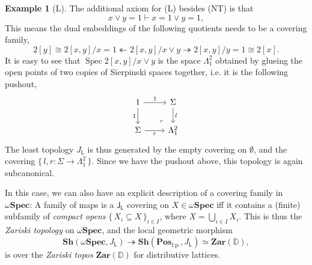 \documentclass[12pt]{amsart}
\theoremstyle{definition}
\newtheorem{example}[theorem]{Example}
\newcommand{\mb}[1]{\mathbf{#1}}
\newcommand{\mbb}[1]{\mathbb{#1}}
\newcommand{\mr}[1]{\mathrm{#1}}
\newcommand{\ms}[1]{\mathsf{#1}}
\newcommand{\Pos}{\mb{Pos}}
\newcommand{\sh}{\mb{Sh}}
\newcommand{\set}[1]{\{\,#1\,\}}
\newcommand{\surj}{\twoheadrightarrow}
\newcommand{\fp}{_{\mr{f.p.}}}
\newcommand{\emp}{\emptyset}
\newcommand{\wSpec}{\omega\mb{Spec}}
\newcommand{\spec}{\operatorname{Spec}}
\begin{document}
\begin{example}[L]
  The additional axiom for (L) besides (NT) is that 
  \[ x \vee y = 1 \vdash x = 1 \vee y = 1, \] 
  This means the dual embeddings of the following quotients needs to be a covering family,
  \[ 2[y] \cong 2[x,y]/x = 1 \twoheadleftarrow 2[x,y]/x\vee y \surj 2[x,y]/y=1 \cong 2[x]. \]
  It is easy to see that $\spec 2[x,y]/x \vee y$ is the space $\Lambda^2_1$ obtained by glueing the open points of two copies of Sierpinski spaces together, i.e. it is the following pushout,
  \[
  \begin{tikzcd}
    1 \ar[d, "1"'] \ar[r, "1"] & \Sigma \ar[d, "l"] \\ 
    \Sigma \ar[r, "r"'] & \Lambda^2_1
    \arrow["\lrcorner"{anchor=center, pos=0.125, rotate=180}, draw=none, from=2-2, to=1-1]    
  \end{tikzcd}
  \]
  The least topology $J_{\ms L}$ is thus generated by the empty covering on $\emp$, and the covering $\set{l,r : \Sigma \to \Lambda^2_1}$. Since we have the pushout above, this topology is again subcanonical. 
  
  In this case, we can also have an explicit description of a covering family in $\wSpec$: A family of maps is a $\ms J_{\ms L}$ covering on $X \in \wSpec$ iff it contains a (finite) subfamily of \emph{compact opens} $\set{X_i\subseteq X}_{i\in I}$, where $X = \bigcup_{i\in I}X_i$. This is thus the \emph{Zariski topology} on $\wSpec$, and the local geometric morphism
  \[ \sh(\wSpec,J_{\ms L}) \surj \sh(\Pos\fp,J_{\ms L}) \simeq \mb{Zar}(\mbb D), \]
  is over the \emph{Zariski topos} $\mb{Zar}(\mbb D)$ for distributive lattices.
\end{example}
\end{document}
